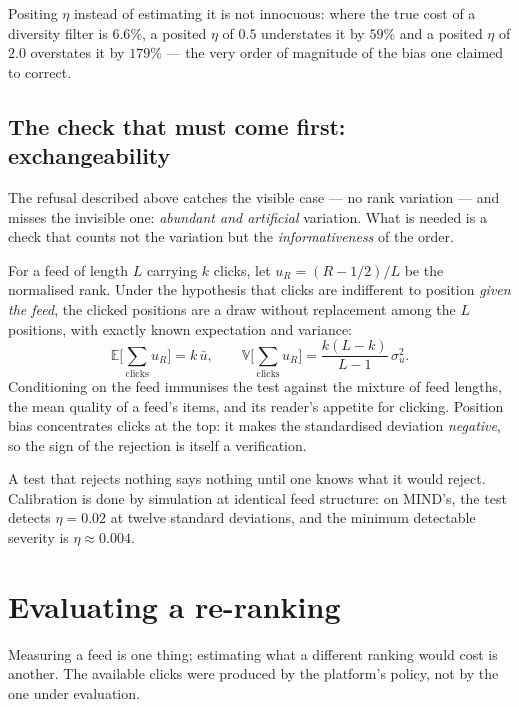 \documentclass[11pt,a4paper]{article}
\begin{document}
Positing $\eta$ instead of estimating it is not innocuous: where the true cost of a diversity
filter is $6.6\%$, a posited $\eta$ of $0.5$ understates it by $59\%$ and a posited $\eta$ of
$2.0$ overstates it by $179\%$ --- the very order of magnitude of the bias one claimed to
correct.

\subsection{The check that must come first: exchangeability}

The refusal described above catches the visible case --- no rank variation --- and misses the
invisible one: \emph{abundant and artificial} variation. What is needed is a check that counts
not the variation but the \emph{informativeness} of the order.

For a feed of length $L$ carrying $k$ clicks, let $u_R = (R - 1/2)/L$ be the normalised rank.
Under the hypothesis that clicks are indifferent to position \emph{given the feed}, the clicked
positions are a draw without replacement among the $L$ positions, with exactly known expectation
and variance:
\begin{equation}
\mathbb{E}\Big[\sum_{\text{clicks}} u_R\Big] = k\,\bar{u}, \qquad
\mathbb{V}\Big[\sum_{\text{clicks}} u_R\Big] = \frac{k(L-k)}{L-1}\,\sigma^2_u .
\label{eq:exchangeability}
\end{equation}
Conditioning on the feed immunises the test against the mixture of feed lengths, the mean
quality of a feed's items, and its reader's appetite for clicking. Position bias concentrates
clicks at the top: it makes the standardised deviation \emph{negative}, so the sign of the
rejection is itself a verification.

A test that rejects nothing says nothing until one knows what it would reject. Calibration is
done by simulation at identical feed structure: on MIND's, the test detects $\eta = 0.02$ at
twelve standard deviations, and the minimum detectable severity is $\eta \approx 0.004$.

\section{Evaluating a re-ranking}
\label{sec:evaluation}

Measuring a feed is one thing; estimating what a different ranking would cost is another. The
available clicks were produced by the platform's policy, not by the one under evaluation.
\end{document}
